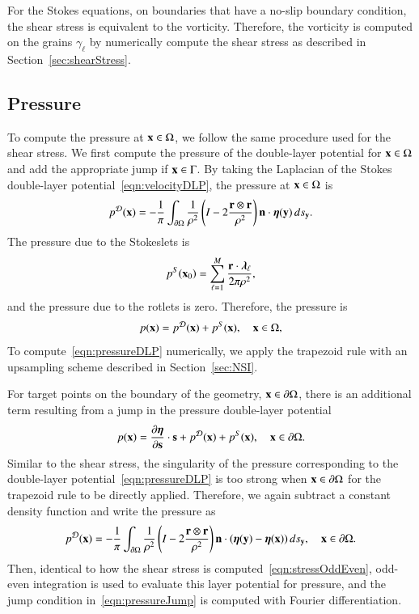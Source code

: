 \documentclass[preprint, 10pt]{elsarticle}
\begin{document}
For the Stokes equations, on boundaries that have a no-slip boundary
condition, the shear stress is equivalent to the vorticity.  Therefore,
the vorticity is computed on the grains $\gamma_\ell$ by numerically
compute the shear stress as described in Section~\ref{sec:shearStress}.

\subsection{Pressure}
\label{sec:pressure}
To compute the pressure at ${\mathbf{x}} \in \Omega$, we follow the same
procedure used for the shear stress.  We first compute the pressure of
the double-layer potential for ${\mathbf{x}} \in \Omega$ and add the appropriate
jump if ${\mathbf{x}} \in \Gamma$. By taking the Laplacian of the Stokes
double-layer potential~\eqref{eqn:velocityDLP}, the pressure at ${\mathbf{x}} \in
\Omega$ is
\begin{align}
  p^{{\mathcal{D}}}({\mathbf{x}}) = -\frac{1}{\pi}\int_{{\partial}\Omega} \frac{1}{\rho^2}
    \left(I - 2 \frac{{\mathbf{r}} \otimes {\mathbf{r}}}{\rho^2}\right) 
    {\mathbf{n}} \cdot {\boldsymbol\eta}({\mathbf{y}}) \,ds_{\mathbf{y}}.
    \label{eqn:pressureDLP}
\end{align}
The pressure due to the Stokeslets is
\begin{align*}
  p^S({\mathbf{x}}_0) = \sum_{\ell=1}^{M}\frac{{\mathbf{r}} \cdot {\boldsymbol\lambda}_\ell}{2\pi\rho^2},
\end{align*}
and the pressure due to the rotlets is zero.  Therefore, the pressure is
\begin{align*}
  p({\mathbf{x}}) = p^{{\mathcal{D}}}({\mathbf{x}}) + p^{S}({\mathbf{x}}), \quad {\mathbf{x}} \in \Omega,
\end{align*}
To compute~\eqref{eqn:pressureDLP} numerically, we apply the trapezoid
rule with an upsampling scheme described in Section~\ref{sec:NSI}.

For target points on the boundary of the geometry, ${\mathbf{x}} \in {\partial} \Omega$,
there is an additional term resulting from a jump in the pressure
double-layer potential~\cite{poz1992}
\begin{align}
  p({\mathbf{x}})= \frac{\partial {\boldsymbol\eta}}{\partial {\mathbf{s}}} \cdot {\mathbf{s}} + p^{{\mathcal{D}}}({\mathbf{x}}) + 
              p^{S}({\mathbf{x}}), \quad {\mathbf{x}} \in {\partial}\Omega.
  \label{eqn:pressureJump}
\end{align}
Similar to the shear stress, the singularity of the pressure
corresponding to the double-layer potential~\eqref{eqn:pressureDLP} is
too strong when ${\mathbf{x}} \in {\partial}\Omega$ for the trapezoid rule to be
directly applied.  Therefore, we again subtract a constant density
function and write the pressure as
\begin{align*}
  p^{\mathcal{D}}({\mathbf{x}}) = -\frac{1}{\pi}\int_{{\partial}\Omega} \frac{1}{\rho^2}
    \left(I - 2 \frac{{\mathbf{r}} \otimes {\mathbf{r}}}{\rho^2}\right) 
    {\mathbf{n}} \cdot ({\boldsymbol\eta}({\mathbf{y}}) - {\boldsymbol\eta}({\mathbf{x}})) \,ds_{\mathbf{y}}, 
    \quad {\mathbf{x}} \in {\partial}\Omega.
\end{align*}
Then, identical to how the shear stress is
computed~\eqref{eqn:stressOddEven}, odd-even integration is used to
evaluate this layer potential for pressure, and the jump condition
in~\eqref{eqn:pressureJump} is computed with Fourier differentiation. 
\end{document}
